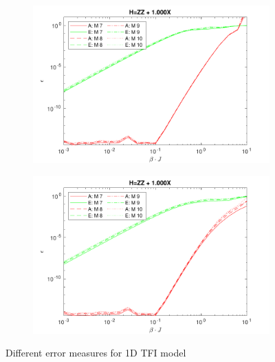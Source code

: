 \begin{figure}[!htbp]
    \begin{subfigure}[]{\linewidth}
        \includegraphics[width=\textwidth]{Figuren/benchmarking/comp_M_cycl.pdf}
    \end{subfigure}
    \begin{subfigure}[]{\linewidth}
        \includegraphics[width=\textwidth]{Figuren/benchmarking/Comp_M_lin.pdf}
    \end{subfigure}
    \caption{ Different error measures for 1D \Gls{TFI} model }
    \label{benchmarking:systemsize}
\end{figure}

\def \expHBlock {\expH{4}{ $e^{- \beta \hat{H}_{n}}$   }{ {,,"...",} }{ {,,"...",} }{}{} }
\def \Mn {\mpo{4}{ {0,,,,0}  }{}{}{{0,0,1,0,0}}{}}

